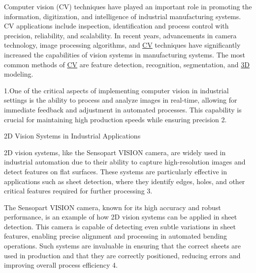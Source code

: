 

Computer vision (CV) techniques have played an important role in promoting the information, digitization, and intelligence of industrial manufacturing systems.
CV applications include inspection, identification and process control with precision, reliability, and scalability.
In recent years, advancements in camera technology, image processing algorithms, and \hyperref[tab:acronyms]{CV} techniques have significantly increased the capabilities of vision systems in manufacturing systems.
The most common methods of \hyperref[tab:acronyms]{CV} are feature detection, recognition, segmentation, and \hyperref[tab:acronyms]{3D} modeling. \cite{9761203}


1.One of the critical aspects of implementing computer vision in industrial settings is the ability to process and analyze images in real-time, allowing for immediate feedback and adjustment in automated processes. This capability is crucial for maintaining high production speeds while ensuring precision 2.

2D Vision Systems in Industrial Applications

2D vision systems, like the Sensopart VISION camera, are widely used in industrial automation due to their ability to capture high-resolution images and detect features on flat surfaces. These systems are particularly effective in applications such as sheet detection, where they identify edges, holes, and other critical features required for further processing 3.

The Sensopart VISION camera, known for its high accuracy and robust performance, is an example of how 2D vision systems can be applied in sheet detection. This camera is capable of detecting even subtle variations in sheet features, enabling precise alignment and processing in automated bending operations. Such systems are invaluable in ensuring that the correct sheets are used in production and that they are correctly positioned, reducing errors and improving overall process efficiency 4.


